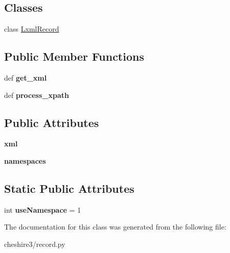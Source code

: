 \subsection*{Classes}
\begin{DoxyCompactItemize}
\item 
class \hyperlink{classcheshire3_1_1record_1_1_minidom_record_1_1_lxml_record}{Lxml\-Record}
\end{DoxyCompactItemize}
\subsection*{Public Member Functions}
\begin{DoxyCompactItemize}
\item 
\hypertarget{classcheshire3_1_1record_1_1_minidom_record_a7815079a3944c8bf8a084f3d93095e31}{def {\bfseries get\-\_\-xml}}\label{classcheshire3_1_1record_1_1_minidom_record_a7815079a3944c8bf8a084f3d93095e31}

\item 
\hypertarget{classcheshire3_1_1record_1_1_minidom_record_a1be6894b4285aa4c5b4e54249f494438}{def {\bfseries process\-\_\-xpath}}\label{classcheshire3_1_1record_1_1_minidom_record_a1be6894b4285aa4c5b4e54249f494438}

\end{DoxyCompactItemize}
\subsection*{Public Attributes}
\begin{DoxyCompactItemize}
\item 
\hypertarget{classcheshire3_1_1record_1_1_minidom_record_a0f532c0bc06114fb9ed95dbb88844ee3}{{\bfseries xml}}\label{classcheshire3_1_1record_1_1_minidom_record_a0f532c0bc06114fb9ed95dbb88844ee3}

\item 
\hypertarget{classcheshire3_1_1record_1_1_minidom_record_a6699aed24dd33a1e9abe62b7192e62d0}{{\bfseries namespaces}}\label{classcheshire3_1_1record_1_1_minidom_record_a6699aed24dd33a1e9abe62b7192e62d0}

\end{DoxyCompactItemize}
\subsection*{Static Public Attributes}
\begin{DoxyCompactItemize}
\item 
\hypertarget{classcheshire3_1_1record_1_1_minidom_record_a0a68de2d782ef518df6bf34f19240102}{int {\bfseries use\-Namespace} = 1}\label{classcheshire3_1_1record_1_1_minidom_record_a0a68de2d782ef518df6bf34f19240102}

\end{DoxyCompactItemize}


The documentation for this class was generated from the following file\-:\begin{DoxyCompactItemize}
\item 
cheshire3/record.\-py\end{DoxyCompactItemize}
